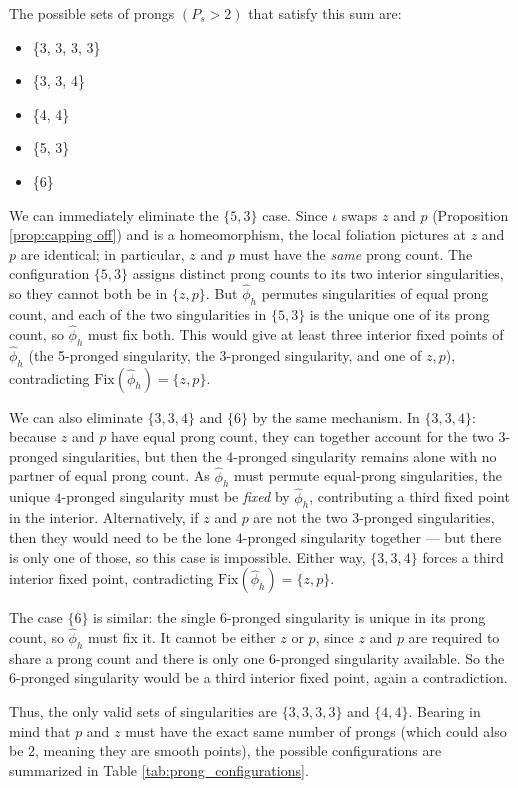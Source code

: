 The possible sets of prongs $(P_s > 2)$ that satisfy this sum are:
\begin{itemize}
    \item \{3, 3, 3, 3\}
    \item \{3, 3, 4\}
    \item \{4, 4\}
    \item \{5, 3\}
    \item \{6\}
\end{itemize}

We can immediately eliminate the $\{5,3\}$ case. Since $\iota$ swaps $z$ and $p$ (Proposition \ref{prop:capping off}) and is a homeomorphism, the local foliation pictures at $z$ and $p$ are identical; in particular, $z$ and $p$ must have the \emph{same} prong count. The configuration $\{5,3\}$ assigns distinct prong counts to its two interior singularities, so they cannot both be in $\{z,p\}$. But $\hat{\phi}_h$ permutes singularities of equal prong count, and each of the two singularities in $\{5,3\}$ is the unique one of its prong count, so $\hat{\phi}_h$ must fix both. This would give at least three interior fixed points of $\hat{\phi}_h$ (the 5-pronged singularity, the 3-pronged singularity, and one of $z, p$), contradicting $\mathrm{Fix}(\hat{\phi}_h) = \{z, p\}$.

We can also eliminate $\{3,3,4\}$ and $\{6\}$ by the same mechanism. In $\{3, 3, 4\}$: because $z$ and $p$ have equal prong count, they can together account for the two $3$-pronged singularities, but then the $4$-pronged singularity remains alone with no partner of equal prong count. As $\hat{\phi}_h$ must permute equal-prong singularities, the unique $4$-pronged singularity must be \emph{fixed} by $\hat{\phi}_h$, contributing a third fixed point in the interior. Alternatively, if $z$ and $p$ are not the two $3$-pronged singularities, then they would need to be the lone $4$-pronged singularity together --- but there is only one of those, so this case is impossible. Either way, $\{3,3,4\}$ forces a third interior fixed point, contradicting $\mathrm{Fix}(\hat{\phi}_h) = \{z, p\}$.

The case $\{6\}$ is similar: the single $6$-pronged singularity is unique in its prong count, so $\hat{\phi}_h$ must fix it. It cannot be either $z$ or $p$, since $z$ and $p$ are required to share a prong count and there is only one $6$-pronged singularity available. So the $6$-pronged singularity would be a third interior fixed point, again a contradiction.

Thus, the only valid sets of singularities are $\{3,3,3,3\}$ and $\{4,4\}$. Bearing in mind that $p$ and $z$ must have the exact same number of prongs (which could also be 2, meaning they are smooth points), the possible configurations are summarized in Table \ref{tab:prong_configurations}.

